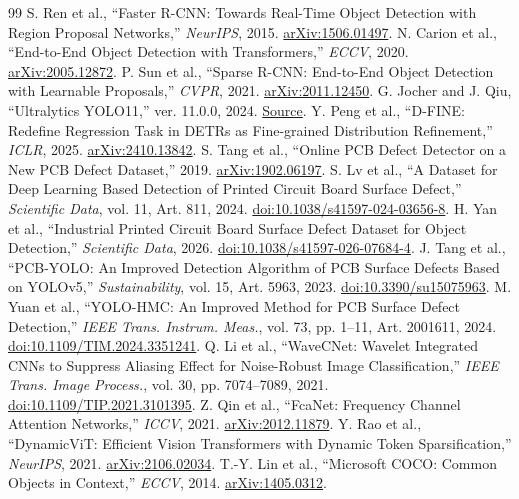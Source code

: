 \documentclass[conference]{IEEEtran}
\begin{document}
\begin{thebibliography}{99}
\fontsize{7.0}{7.4}\selectfont
\setlength{\itemsep}{0pt}
\setlength{\parskip}{0pt}
 S. Ren et al., ``Faster R-CNN: Towards Real-Time Object Detection with Region Proposal Networks,'' \textit{NeurIPS}, 2015. \href{https://arxiv.org/abs/1506.01497}{arXiv:1506.01497}.
 N. Carion et al., ``End-to-End Object Detection with Transformers,'' \textit{ECCV}, 2020. \href{https://arxiv.org/abs/2005.12872}{arXiv:2005.12872}.
 P. Sun et al., ``Sparse R-CNN: End-to-End Object Detection with Learnable Proposals,'' \textit{CVPR}, 2021. \href{https://arxiv.org/abs/2011.12450}{arXiv:2011.12450}.
 G. Jocher and J. Qiu, ``Ultralytics YOLO11,'' ver. 11.0.0, 2024. \href{https://github.com/ultralytics/ultralytics}{Source}.
 Y. Peng et al., ``D-FINE: Redefine Regression Task in DETRs as Fine-grained Distribution Refinement,'' \textit{ICLR}, 2025. \href{https://arxiv.org/abs/2410.13842}{arXiv:2410.13842}.
 S. Tang et al., ``Online PCB Defect Detector on a New PCB Defect Dataset,'' 2019. \href{https://arxiv.org/abs/1902.06197}{arXiv:1902.06197}.
 S. Lv et al., ``A Dataset for Deep Learning Based Detection of Printed Circuit Board Surface Defect,'' \textit{Scientific Data}, vol. 11, Art. 811, 2024. \href{https://doi.org/10.1038/s41597-024-03656-8}{doi:10.1038/s41597-024-03656-8}.
 H. Yan et al., ``Industrial Printed Circuit Board Surface Defect Dataset for Object Detection,'' \textit{Scientific Data}, 2026. \href{https://doi.org/10.1038/s41597-026-07684-4}{doi:10.1038/s41597-026-07684-4}.
 J. Tang et al., ``PCB-YOLO: An Improved Detection Algorithm of PCB Surface Defects Based on YOLOv5,'' \textit{Sustainability}, vol. 15, Art. 5963, 2023. \href{https://doi.org/10.3390/su15075963}{doi:10.3390/su15075963}.
 M. Yuan et al., ``YOLO-HMC: An Improved Method for PCB Surface Defect Detection,'' \textit{IEEE Trans. Instrum. Meas.}, vol. 73, pp. 1--11, Art. 2001611, 2024. \href{https://doi.org/10.1109/TIM.2024.3351241}{doi:10.1109/TIM.2024.3351241}.
 Q. Li et al., ``WaveCNet: Wavelet Integrated CNNs to Suppress Aliasing Effect for Noise-Robust Image Classification,'' \textit{IEEE Trans. Image Process.}, vol. 30, pp. 7074--7089, 2021. \href{https://doi.org/10.1109/TIP.2021.3101395}{doi:10.1109/TIP.2021.3101395}.
 Z. Qin et al., ``FcaNet: Frequency Channel Attention Networks,'' \textit{ICCV}, 2021. \href{https://arxiv.org/abs/2012.11879}{arXiv:2012.11879}.
 Y. Rao et al., ``DynamicViT: Efficient Vision Transformers with Dynamic Token Sparsification,'' \textit{NeurIPS}, 2021. \href{https://arxiv.org/abs/2106.02034}{arXiv:2106.02034}.
 T.-Y. Lin et al., ``Microsoft COCO: Common Objects in Context,'' \textit{ECCV}, 2014. \href{https://arxiv.org/abs/1405.0312}{arXiv:1405.0312}.
\end{thebibliography}
\end{document}
